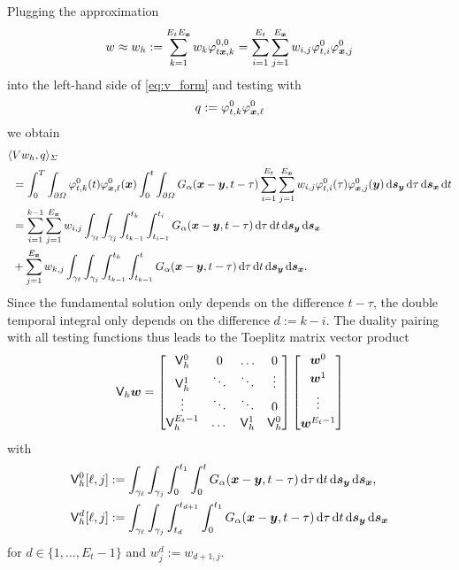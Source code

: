 \documentclass[a4paper,11pt]{article}
\begin{document}
Plugging the approximation
\begin{equation*}
 w \approx w_h := \sum_{k=1}^{E_t E_{{\bm{x}}}} w_k \varphi^{0,0}_{t{{\bm{x}}},k} = \sum_{i=1}^{E_t} \sum_{j=1}^{E_{{\bm{x}}}} w_{i,j} \varphi^0_{t,i} \varphi^0_{{{\bm{x}}},j}
\end{equation*}
into the left-hand side of \eqref{eq:v_form} and testing with
\begin{equation*}
  q := \varphi^0_{t,k} \varphi^0_{{{\bm{x}}},\ell}
\end{equation*}
we obtain
\begin{align*}
  \langle &Vw_h, q \rangle_\Sigma \\
  &= \int_0^T \int_{\partial\Omega} \varphi^0_{t,k}(t) \varphi^0_{{{\bm{x}}},\ell}({{\bm{x}}}) \int_0^t \int_{\partial\Omega} G_\alpha({{\bm{x}}}-{{\bm{y}}},t-\tau) \sum_{i=1}^{E_t} \sum_{j=1}^{E_{{\bm{x}}}} w_{i,j} \varphi^0_{t,i}(\tau) \varphi^0_{{{\bm{x}}},j}({{\bm{y}}}) \,{\mathrm{d}}{{\bm{s}}}_{{\bm{y}}} \,{\mathrm{d}}\tau \,{\mathrm{d}}{{\bm{s}}}_{{\bm{x}}} \,{\mathrm{d}} t \\
  &= \sum_{i=1}^{k-1} \sum_{j=1}^{E_{{\bm{x}}}} w_{i,j} \int_{\gamma_\ell} \int_{\gamma_j} \int_{t_{k-1}}^{t_k} \int_{t_{i-1}}^{t_i} G_\alpha({{\bm{x}}}-{{\bm{y}}},t-\tau) \,{\mathrm{d}}\tau \,{\mathrm{d}} t \,{\mathrm{d}}{{\bm{s}}}_{{\bm{y}}} \,{\mathrm{d}}{{\bm{s}}}_{{\bm{x}}} \\
  &+ \sum_{j=1}^{E_{{\bm{x}}}} w_{k,j} \int_{\gamma_\ell} \int_{\gamma_j} \int_{t_{k-1}}^{t_k} \int_{t_{k-1}}^{t} G_\alpha({{\bm{x}}}-{{\bm{y}}},t-\tau) \,{\mathrm{d}}\tau \,{\mathrm{d}} t \,{\mathrm{d}}{{\bm{s}}}_{{\bm{y}}} \,{\mathrm{d}}{{\bm{s}}}_{{\bm{x}}}.
\end{align*}
Since the fundamental solution only depends on the difference $t-\tau$, the double temporal integral only depends on the difference $d := k - i$. The duality pairing with all testing functions thus leads to the Toeplitz matrix vector product
\begin{equation}
\label{eq:V_mat}
  {\ensuremath{{\mathsf{V}}}}_h {{\bm{w}}} = 
  \begin{bmatrix}
    {\ensuremath{{\mathsf{V}}}}_h^0 & 0 & \ldots & 0 \\
    {{\mathsf{V}}}_h^1 & \ddots & \ddots & \vdots \\
    \vdots & \ddots & \ddots & 0 \\
    {{\mathsf{V}}}_h^{E_t-1} & \dots & {{\mathsf{V}}}_h^1 & {{\mathsf{V}}}_h^0
  \end{bmatrix}
  \begin{bmatrix}
    {\ensuremath{{\bm{w}}}}^0 \\[1mm]
    {\ensuremath{{\bm{w}}}}^1 \\[1mm]
    \vdots \\[1mm]
    {\ensuremath{{\bm{w}}}}^{E_t-1}
  \end{bmatrix}
\end{equation}
with 
\begin{equation}
\label{eq:V_blocks}
\begin{aligned}
  {\ensuremath{{\mathsf{V}}}}_h^0[\ell,j] &:= \int_{\gamma_\ell} \int_{\gamma_j} \int_{0}^{t_1} \int_{0}^{t} G_\alpha({{\bm{x}}}-{{\bm{y}}},t-\tau) \,{\mathrm{d}}\tau \,{\mathrm{d}} t \,{\mathrm{d}}{{\bm{s}}}_{{\bm{y}}} \,{\mathrm{d}}{{\bm{s}}}_{{\bm{x}}}, \\
  {{\mathsf{V}}}_h^d[\ell,j] &:= \int_{\gamma_\ell} \int_{\gamma_j} \int_{t_d}^{t_{d+1}} \int_{0}^{t_1} G_\alpha({{\bm{x}}}-{{\bm{y}}},t-\tau) \,{\mathrm{d}}\tau \,{\mathrm{d}} t \,{\mathrm{d}}{{\bm{s}}}_{{\bm{y}}} \,{\mathrm{d}}{{\bm{s}}}_{{\bm{x}}}
\end{aligned}
\end{equation}
for $d \in \{1,\ldots,E_t-1\}$ and $w^d_j := w_{d+1,j}$.
\end{document}
